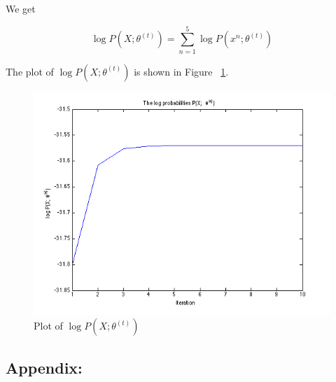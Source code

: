 \documentclass[a4paper]{article}
\begin{document}
We get 

\begin{equation}
	\log P(X; \theta^{(t)}) = \sum_{n=1}^5 \log P(x^n; \theta^{(t)})
\end{equation}

The plot of $\log P(X; \theta^{(t)})$ is shown in Figure ~\ref{fig:log_P_X}.

\begin{figure}[H]
  \centering
    \includegraphics[scale=.57]{images/log_P_X.png}
  \caption{Plot of $\log P(X; \theta^{(t)})$}
  \label{fig:log_P_X}
\end{figure}

\newpage
\subsection*{Appendix:}
	
	
	
	
	
	
	
	
	
	
	
	
	
	
\end{document}
